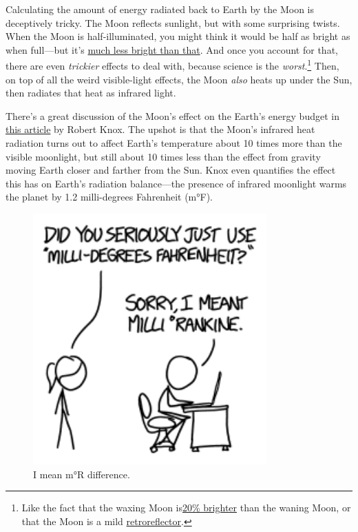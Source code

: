{{Calculating the amount of energy radiated back to Earth by the Moon is deceptively tricky. The Moon reflects sunlight, but with some surprising twists. When the Moon is half-illuminated, you might think it would be half as bright as when full—but it's \href{http://home.earthlink.net/\~kitathome/LunarLight/moonlight\_gallery/technique/moonbright.htm}{much less bright than that}. And once you account for that, there are even \emph{trickier} effects to deal with, because science is the \emph{worst}.{\footnote{Like the fact that the waxing Moon is\href{http://www.jstor.org/discover/10.2307/2402251?sid=21105340972791&uid=2&uid=4&uid=3739808&uid=3739256}{20\% brighter} than the waning Moon, or that the Moon is a mild \href{http://en.wikipedia.org/wiki/Opposition\_surge} {retroreflector}.} } Then, on top of all the weird visible-light effects, the Moon \emph{also} heats up under the Sun, then radiates that heat as infrared light.}

{There's a great discussion of the Moon's effect on the Earth's energy budget in \href{http://scitation.aip.org/content/aapt/journal/ajp/67/12/10.1119/1.19109?ver=pdfcov}{this article} by Robert Knox. The upshot is that the Moon's infrared heat radiation turns out to affect Earth's temperature about 10 times more than the visible moonlight, but still about 10 times less than the effect from gravity moving Earth closer and farther from the Sun. Knox even quantifies the effect this has on Earth's radiation balance—the presence of infrared moonlight warms the planet by 1.2 milli-degrees Fahrenheit (m°F).}

\begin{figure}[!htbp]
\centering
\includegraphics[scale=0.5, max width=0.8\textwidth]{imgs/a/129/unit.png}
\caption{I mean m°R difference.}
\end{figure}

}

